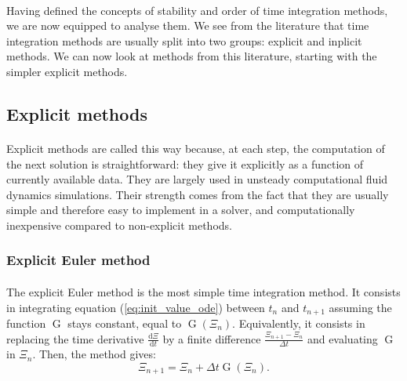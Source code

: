       \paragraph{}
      Having defined the concepts of stability and order of time integration methods, we are now equipped to analyse them.
      We see from the literature that time integration methods are usually split into two groups: explicit and inplicit methods.
      We can now look at methods from this literature, starting with the simpler explicit methods.


    \subsection{Explicit methods}

      \paragraph{}
      Explicit methods are called this way because, at each step, the computation of the next solution is straightforward: they give it explicitly as a function of currently available data.
      They are largely used in unsteady computational fluid dynamics simulations.
      Their strength comes from the fact that they are usually simple and therefore easy to implement in a solver, and computationally inexpensive compared to non-explicit methods.


      \subsubsection{Explicit Euler method}

        \paragraph{}
        The explicit Euler method is the most simple time integration method.
        It consists in integrating equation (\ref{eq:init_value_ode}) between $t_n$ and $t_{n+1}$ assuming the function $\operatorname{G}$ stays constant, equal to $\operatorname{G}\left(\Xi_n\right)$.
        Equivalently, it consists in replacing the time derivative $\frac{\mathrm{d} \Xi}{\mathrm{d} t}$ by a finite difference $\frac{\Xi_{n+1} - \Xi_n}{\Delta t}$ and evaluating $\operatorname{G}$ in $\Xi_n$.
        Then, the method gives:
        \begin{equation}
          \Xi_{n+1} = \Xi_n + \Delta t \operatorname{G}\left(\Xi_n\right) .
        \end{equation}

